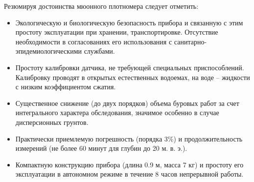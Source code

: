 Резюмируя достоинства мюонного плотномера следует отметить:
\begin{itemize}
  \item Экологическую и биологическую безопасность прибора и 
  связанную с этим простоту эксплуатации при хранении, 
  транспортировке. Отсутствие необходимости в 
  согласованиях его использования с санитарно-эпидемиологическими 
  службами.
  \item Простоту калибровки датчика, не требующей специальных 
  приспособлений. Калибровку проводят в открытых естественных 
  водоемах, на воде – жидкости с низким коэффициентом сжатия. 
  \item Существенное снижение (до двух порядков) объема 
  буровых работ  за счет интегрального характера обследования, 
  значимое особенно в случае дисперсионных грунтов.
  \item Практически приемлемую погрешность (порядка 3\%) и 
  продолжительность измерений (не более 60 минут для глубин до 
  20 м. в. э.).
  \item Компактную конструкцию прибора (длина 0.9 м, масса 7 кг) 
  и простоту его эксплуатации в автономном режиме в течение 8 
  часов непрерывной работы.
\end{itemize}

\clearpage